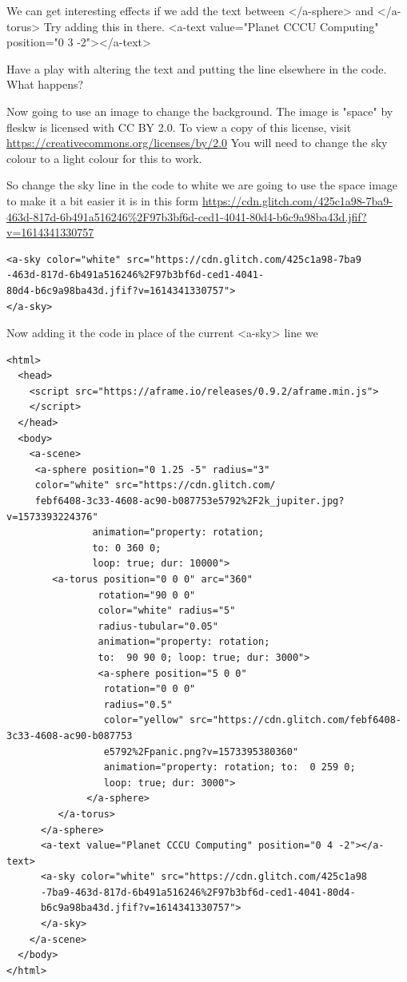 We can get interesting effects if we add the text between  </a-sphere> and </a-torus> Try adding this in there. <a-text value="Planet CCCU Computing" position="0 3 -2"></a-text>

Have a play with altering the text and putting the line elsewhere in the code. What happens?

Now going to use an image to change the background. The image is "space" by fleskw is licensed with CC BY 2.0. To view a copy of this license, visit \url{https://creativecommons.org/licenses/by/2.0} You will need to change the sky colour to a light colour for this to work. 

So change the sky line in the code to white we are going to use the space image to make it a bit easier it is in this form \url{https://cdn.glitch.com/425c1a98-7ba9-463d-817d-6b491a516246%2F97b3bf6d-ced1-4041-80d4-b6c9a98ba43d.jfif?v=1614341330757} 

\begin{lstlisting}
<a-sky color="white" src="https://cdn.glitch.com/425c1a98-7ba9
-463d-817d-6b491a516246%2F97b3bf6d-ced1-4041-
80d4-b6c9a98ba43d.jfif?v=1614341330757">
</a-sky>
\end{lstlisting}
Now adding it the code in place of the current <a-sky> line we 
\begin{lstlisting}
<html>
  <head>
    <script src="https://aframe.io/releases/0.9.2/aframe.min.js">
    </script>
  </head>
  <body>
    <a-scene>
     <a-sphere position="0 1.25 -5" radius="3" 
     color="white" src="https://cdn.glitch.com/
     febf6408-3c33-4608-ac90-b087753e5792%2F2k_jupiter.jpg?v=1573393224376"
               animation="property: rotation; 
               to: 0 360 0; 
               loop: true; dur: 10000">
        <a-torus position="0 0 0" arc="360"
                rotation="90 0 0"
                color="white" radius="5"
                radius-tubular="0.05"
                animation="property: rotation; 
                to:  90 90 0; loop: true; dur: 3000">
                <a-sphere position="5 0 0"
                 rotation="0 0 0"
                 radius="0.5"
                 color="yellow" src="https://cdn.glitch.com/febf6408-3c33-4608-ac90-b087753
                 e5792%2Fpanic.png?v=1573395380360"
                 animation="property: rotation; to:  0 259 0; 
                 loop: true; dur: 3000">
              </a-sphere>
         </a-torus>
      </a-sphere>   
      <a-text value="Planet CCCU Computing" position="0 4 -2"></a-text>
      <a-sky color="white" src="https://cdn.glitch.com/425c1a98
      -7ba9-463d-817d-6b491a516246%2F97b3bf6d-ced1-4041-80d4-
      b6c9a98ba43d.jfif?v=1614341330757">
      </a-sky>
    </a-scene>
  </body>
</html>
\end{lstlisting}

